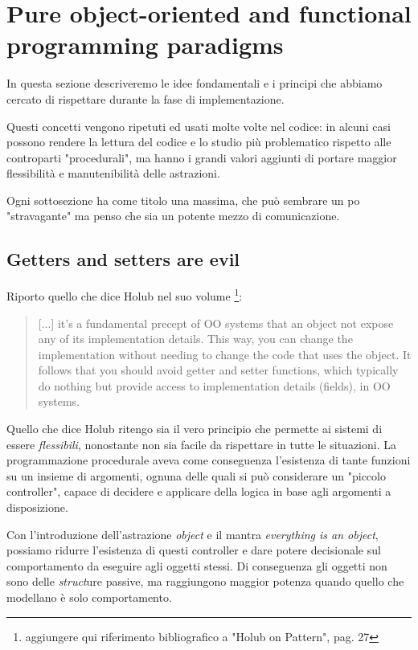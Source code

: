 \section{Pure object-oriented and functional programming paradigms}
\label{sec:objects-oriented-functional-paradigms}

In questa sezione descriveremo le idee fondamentali e i principi che
abbiamo cercato di rispettare durante la fase di
implementazione.

Questi concetti vengono ripetuti ed usati molte volte nel codice: in
alcuni casi possono rendere la lettura del codice e lo studio pi\`u
problematico rispetto alle controparti "procedurali", ma hanno i
grandi valori aggiunti di portare maggior flessibilit\`a e
manutenibilit\`a delle astrazioni.

Ogni sottosezione ha come titolo una massima, che pu\`o sembrare un po
"stravagante" ma penso che sia un potente mezzo di comunicazione.

\subsection{Getters and setters are evil}
Riporto quello che dice Holub nel suo volume \footnote{aggiungere qui
  riferimento bibliografico a "Holub on Pattern", pag. 27}:
\begin{quotation}
  [...] it's a fundamental precept of OO systems that an object not
  expose any of its implementation details. This way, you can change
  the implementation without needing to change the code that uses the
  object. It follows that you should avoid getter and setter
  functions, which typically do nothing but provide access to
  implementation details (fields), in OO systems.
\end{quotation}

Quello che dice Holub ritengo sia il vero principio che permette ai
sistemi di essere \emph{flessibili}, nonostante non sia facile da
rispettare in tutte le situazioni. La programmazione procedurale aveva
come conseguenza l'esistenza di tante funzioni su un insieme di
argomenti, ognuna delle quali si pu\`o considerare un "piccolo
controller", capace di decidere e applicare della logica in base agli
argomenti a disposizione.

Con l'introduzione dell'astrazione \emph{object} e il mantra
\emph{everything is an object}, possiamo ridurre l'esistenza di questi
controller e dare potere decisionale sul comportamento da eseguire
agli oggetti stessi. Di conseguenza gli oggetti non sono delle
\emph{struct}ure passive, ma raggiungono maggior potenza quando quello
che modellano \`e solo comportamento.

